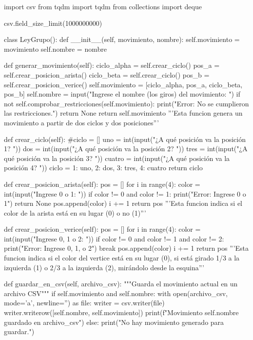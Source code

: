 
import csv
from tqdm import tqdm
from collections import deque

csv.field_size_limit(1000000000)

class LeyGrupo():
    def __init__(self, movimiento, nombre):
        self.movimiento = movimiento
        self.nombre = nombre
    
    def generar_movimiento(self):
        ciclo_alpha = self.crear_ciclo()
        pos_a = self.crear_posicion_arista()
        ciclo_beta = self.crear_ciclo()
        pos_b = self.crear_posicion_verice()
        self.movimiento = [ciclo_alpha, pos_a, ciclo_beta, pos_b]
        self.nombre = input("Ingrese el nombre (los giros) del movimiento: ")
        if not self.comprobar_restricciones(self.movimiento):
            print("Error: No se cumplieron las restricciones.")
            return None
        return self.movimiento
    '''Esta funcion genera un movimiento a partir de dos ciclos y dos posiciones'''
    
    def crear_ciclo(self):
        #ciclo = []
        uno = int(input("¿A qué posición va la posición 1? "))
        dos = int(input("¿A qué posición va la posición 2? "))
        tres = int(input("¿A qué posición va la posición 3? "))
        cuatro = int(input("¿A qué posición va la posición 4? "))
        ciclo = {1: uno, 2: dos, 3: tres, 4: cuatro}
        return ciclo
    
    def crear_posicion_arista(self):
        pos = []
        for i in range(4):
            color = int(input("Ingrese 0 o 1: "))
            if color != 0 and color != 1:
                print("Error: Ingrese 0 o 1")
                return None
            pos.append(color)
            i += 1
        return pos
    '''Esta funcion indica si el color de la arista está en su lugar (0) o no (1)'''

    def crear_posicion_verice(self):
        pos = []
        for i in range(4):
            color = int(input("Ingrese 0, 1 o 2: "))
            if color != 0 and color != 1 and color != 2:
                print("Error: Ingrese 0, 1, o 2")
                break
            pos.append(color)
            i += 1
        return pos
    '''Esta funcion indica si el color del vertice está en su lugar (0), si está girado 1/3 a la izquierda (1) o 2/3 a la izquierda (2), mirándolo desde la esquina'''
    
    def guardar_en_csv(self, archivo_csv):
        """Guarda el movimiento actual en un archivo CSV"""
        if self.movimiento and self.nombre:
            with open(archivo_csv, mode='a', newline='') as file:
                writer = csv.writer(file)
                writer.writerow([self.nombre, self.movimiento])
            print(f"Movimiento {self.nombre} guardado en {archivo_csv}")
        else:
            print("No hay movimiento generado para guardar.")


